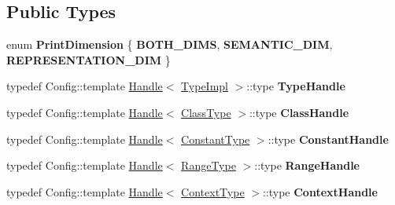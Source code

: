 \subsection*{Public Types}
\begin{DoxyCompactItemize}
\item 
\hypertarget{classv8_1_1internal_1_1_type_impl_aba52f9c8bfd11d3dbd427117e7b1fc6b}{}enum {\bfseries Print\+Dimension} \{ {\bfseries B\+O\+T\+H\+\_\+\+D\+I\+M\+S}, 
{\bfseries S\+E\+M\+A\+N\+T\+I\+C\+\_\+\+D\+I\+M}, 
{\bfseries R\+E\+P\+R\+E\+S\+E\+N\+T\+A\+T\+I\+O\+N\+\_\+\+D\+I\+M}
 \}\label{classv8_1_1internal_1_1_type_impl_aba52f9c8bfd11d3dbd427117e7b1fc6b}

\item 
\hypertarget{classv8_1_1internal_1_1_type_impl_a5db40831f5531a73dbd62df8ef67f3e6}{}typedef Config\+::template \hyperlink{classv8_1_1internal_1_1_handle}{Handle}$<$ \hyperlink{classv8_1_1internal_1_1_type_impl}{Type\+Impl} $>$\+::type {\bfseries Type\+Handle}\label{classv8_1_1internal_1_1_type_impl_a5db40831f5531a73dbd62df8ef67f3e6}

\item 
\hypertarget{classv8_1_1internal_1_1_type_impl_a9813fea0dd6b9ec21ceff1505375b7d4}{}typedef Config\+::template \hyperlink{classv8_1_1internal_1_1_handle}{Handle}$<$ \hyperlink{classv8_1_1internal_1_1_type_impl_1_1_class_type}{Class\+Type} $>$\+::type {\bfseries Class\+Handle}\label{classv8_1_1internal_1_1_type_impl_a9813fea0dd6b9ec21ceff1505375b7d4}

\item 
\hypertarget{classv8_1_1internal_1_1_type_impl_ac8ad84e0c59be6da9343b7cdf83cd12e}{}typedef Config\+::template \hyperlink{classv8_1_1internal_1_1_handle}{Handle}$<$ \hyperlink{classv8_1_1internal_1_1_type_impl_1_1_constant_type}{Constant\+Type} $>$\+::type {\bfseries Constant\+Handle}\label{classv8_1_1internal_1_1_type_impl_ac8ad84e0c59be6da9343b7cdf83cd12e}

\item 
\hypertarget{classv8_1_1internal_1_1_type_impl_a108420864785ec8e3981ae27de8aa19c}{}typedef Config\+::template \hyperlink{classv8_1_1internal_1_1_handle}{Handle}$<$ \hyperlink{classv8_1_1internal_1_1_type_impl_1_1_range_type}{Range\+Type} $>$\+::type {\bfseries Range\+Handle}\label{classv8_1_1internal_1_1_type_impl_a108420864785ec8e3981ae27de8aa19c}

\item 
\hypertarget{classv8_1_1internal_1_1_type_impl_a09f34a11aa5d1627998c002e93f1c52b}{}typedef Config\+::template \hyperlink{classv8_1_1internal_1_1_handle}{Handle}$<$ \hyperlink{classv8_1_1internal_1_1_type_impl_1_1_context_type}{Context\+Type} $>$\+::type {\bfseries Context\+Handle}\label{classv8_1_1internal_1_1_type_impl_a09f34a11aa5d1627998c002e93f1c52b}


\end{DoxyCompactItemize}
